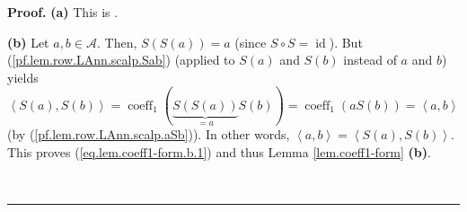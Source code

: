 \documentclass[numbers=enddot,12pt,final,onecolumn,notitlepage]{scrartcl}%
\numberwithin{exer}{subsection}
\theoremstyle{definition}
\newenvironment{proof}[1][Proof]{\noindent\textbf{#1.} }{\ \rule{0.5em}{0.5em}}
\begin{document}
\begin{proof}
\textbf{(a)} This is \cite[Proposition 6.8.17]{sga}. \medskip

\textbf{(b)} Let $a,b\in\mathcal{A}$. Then, $S\left(  S\left(  a\right)
\right)  =a$ (since $S\circ S=\operatorname*{id}$). But
(\ref{pf.lem.row.LAnn.scalp.Sab}) (applied to $S\left(  a\right)  $ and
$S\left(  b\right)  $ instead of $a$ and $b$) yields%
\[
\left\langle S\left(  a\right)  ,S\left(  b\right)  \right\rangle
=\operatorname*{coeff}\nolimits_{1}\left(  \underbrace{S\left(  S\left(
a\right)  \right)  }_{=a}S\left(  b\right)  \right)  =\operatorname*{coeff}%
\nolimits_{1}\left(  aS\left(  b\right)  \right)  =\left\langle
a,b\right\rangle
\]
(by (\ref{pf.lem.row.LAnn.scalp.aSb})). In other words, $\left\langle
a,b\right\rangle =\left\langle S\left(  a\right)  ,S\left(  b\right)
\right\rangle $. This proves (\ref{eq.lem.coeff1-form.b.1}) and thus Lemma
\ref{lem.coeff1-form} \textbf{(b)}. \medskip


\end{proof}
\end{document}
